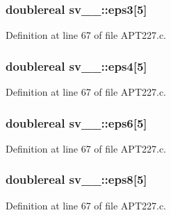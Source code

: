 \subsubsection[{\texorpdfstring{eps3}{eps3}}]{\setlength{\rightskip}{0pt plus 5cm}doublereal sv\+\_\+\_\+\+::eps3\mbox{[}5\mbox{]}}\hypertarget{structsv__1___a7defa9e21fe4bce5011ce3d9b0a7b1e9}{}\label{structsv__1___a7defa9e21fe4bce5011ce3d9b0a7b1e9}


Definition at line 67 of file A\+P\+T227.\+c.

\subsubsection[{\texorpdfstring{eps4}{eps4}}]{\setlength{\rightskip}{0pt plus 5cm}doublereal sv\+\_\+\_\+\+::eps4\mbox{[}5\mbox{]}}\hypertarget{structsv__1___aa65f22f44615750e1268e5bb8a040393}{}\label{structsv__1___aa65f22f44615750e1268e5bb8a040393}


Definition at line 67 of file A\+P\+T227.\+c.

\subsubsection[{\texorpdfstring{eps6}{eps6}}]{\setlength{\rightskip}{0pt plus 5cm}doublereal sv\+\_\+\_\+\+::eps6\mbox{[}5\mbox{]}}\hypertarget{structsv__1___aa28ef65cbfdceb301d5e6b42a959eff3}{}\label{structsv__1___aa28ef65cbfdceb301d5e6b42a959eff3}


Definition at line 67 of file A\+P\+T227.\+c.

\subsubsection[{\texorpdfstring{eps8}{eps8}}]{\setlength{\rightskip}{0pt plus 5cm}doublereal sv\+\_\+\_\+\+::eps8\mbox{[}5\mbox{]}}\hypertarget{structsv__1___a74d64ca6dc191d2553855f82017a089f}{}\label{structsv__1___a74d64ca6dc191d2553855f82017a089f}


Definition at line 67 of file A\+P\+T227.\+c.


